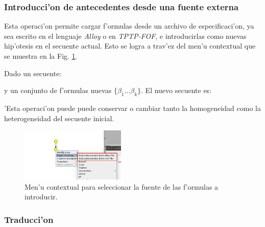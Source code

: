 \subsubsection{Introducci'on de antecedentes desde una fuente externa}

Esta operaci'on permite cargar f'ormulas desde un archivo de especificaci'on, ya sea escrito en el lenguaje \textit{Alloy} o en \textit{TPTP-FOF}, e introducirlas como nuevas hip'otesis en el secuente actual. Esto se logra a trav'ez del men'u contextual que se muestra en la Fig. \ref{seleccion_formulas_para_introducir}.

Dado un secuente:
\begin{prooftree}
\end{prooftree}
y un conjunto de f'ormulas nuevas $\{\beta_1 \ldots \beta_k\}$. El nuevo secuente es:
\begin{prooftree}
\end{prooftree}

'Esta operaci'on puede puede conservar o cambiar tanto la homogeneidad como la heterogeneidad del secuente inicial.

\begin{figure}
\centering
\parbox{5cm}{
\includegraphics[width=5cm]{img/add_antecedents_1.png}	
\caption{Men'u contextual para seleccionar la fuente de las f'ormulas a introducir.}}
\label{seleccion_formulas_para_introducir}
\end{figure}


\subsubsection{Traducci'on}

